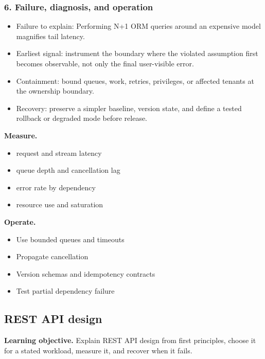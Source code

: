 \subsubsection*{6. Failure, diagnosis, and operation}
\begin{itemize}
\item Failure to explain: Performing N+1 ORM queries around an expensive model magnifies tail latency.
\item Earliest signal: instrument the boundary where the violated assumption first becomes observable, not only the final user-visible error.
\item Containment: bound queues, work, retries, privileges, or affected tenants at the ownership boundary.
\item Recovery: preserve a simpler baseline, version state, and define a tested rollback or degraded mode before release.
\end{itemize}
\textbf{Measure.}\begin{itemize}
\item request and stream latency
\item queue depth and cancellation lag
\item error rate by dependency
\item resource use and saturation
\end{itemize}
\textbf{Operate.}\begin{itemize}
\item Use bounded queues and timeouts
\item Propagate cancellation
\item Version schemas and idempotency contracts
\item Test partial dependency failure
\end{itemize}
\subsection{REST API design}
\textbf{Learning objective.} Explain REST API design from first principles, choose it for a stated workload, measure it, and recover when it fails.

